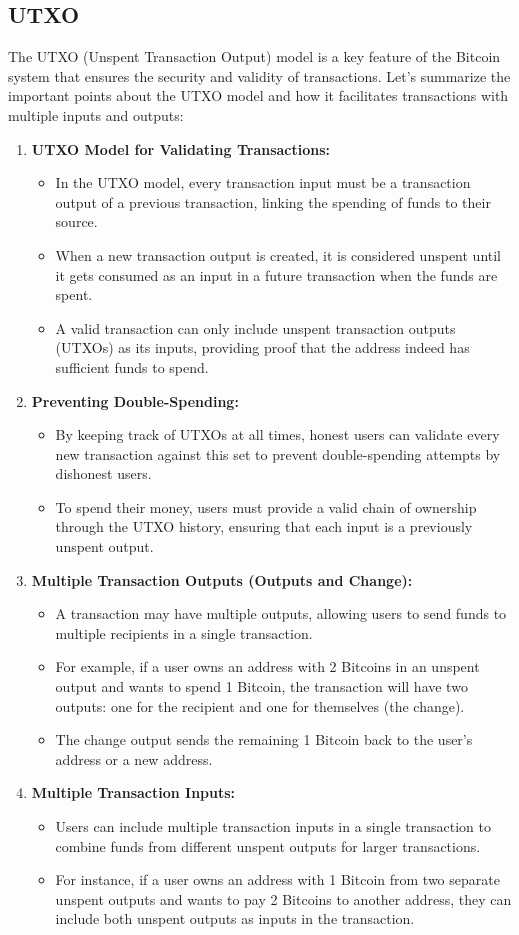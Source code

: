 \documentclass{report}
\begin{document}
\subsection{UTXO}
The UTXO (Unspent Transaction Output) model is a key feature of the Bitcoin system that ensures the security and validity of transactions. Let's summarize the important points about the UTXO model and how it facilitates transactions with multiple inputs and outputs:
\begin{enumerate}
	\item \textbf{UTXO Model for Validating Transactions:} 
	\begin{itemize}
		\item In the UTXO model, every transaction input must be a transaction output of a previous transaction, linking the spending of funds to their source.
		\item When a new transaction output is created, it is considered unspent until it gets consumed as an input in a future transaction when the funds are spent.
		\item A valid transaction can only include unspent transaction outputs (UTXOs) as its inputs, providing proof that the address indeed has sufficient funds to spend.
	\end{itemize}
	\item \textbf{Preventing Double-Spending:}
	\begin{itemize}
		\item By keeping track of UTXOs at all times, honest users can validate every new transaction against this set to prevent double-spending attempts by dishonest users.
		\item To spend their money, users must provide a valid chain of ownership through the UTXO history, ensuring that each input is a previously unspent output.
	\end{itemize}
	\item \textbf{Multiple Transaction Outputs (Outputs and Change):}
	\begin{itemize}
		\item A transaction may have multiple outputs, allowing users to send funds to multiple recipients in a single transaction.
		\item For example, if a user owns an address with 2 Bitcoins in an unspent output and wants to spend 1 Bitcoin, the transaction will have two outputs: one for the recipient and one for themselves (the change).
		\item The change output sends the remaining 1 Bitcoin back to the user's address or a new address.
	\end{itemize}
	\item \textbf{Multiple Transaction Inputs:}
	\begin{itemize}
		\item Users can include multiple transaction inputs in a single transaction to combine funds from different unspent outputs for larger transactions.
		\item For instance, if a user owns an address with 1 Bitcoin from two separate unspent outputs and wants to pay 2 Bitcoins to another address, they can include both unspent outputs as inputs in the transaction.
	\end{itemize}
\end{enumerate}
\end{document}
